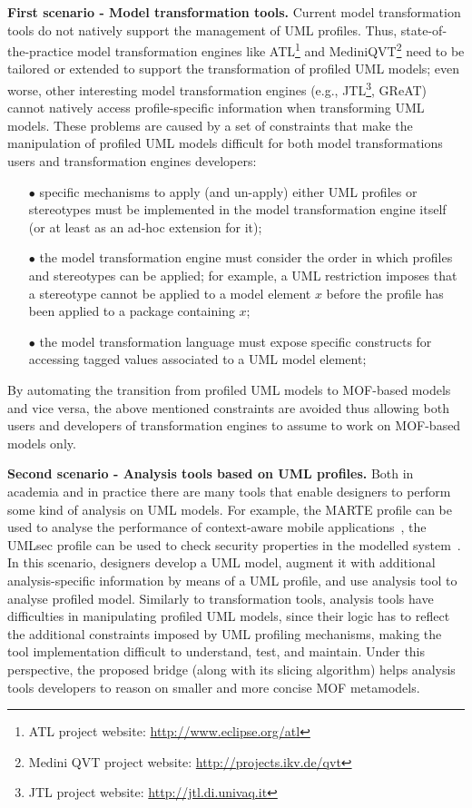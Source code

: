 \textbf{First scenario - Model transformation tools.}
Current model transformation tools do not natively support the management of UML profiles.
Thus, state-of-the-practice model transformation engines
like ATL\footnote{ATL project website: \small{\url{http://www.eclipse.org/atl}}} and
MediniQVT\footnote{Medini QVT project website: \small{\url{http://projects.ikv.de/qvt}}}
need to be tailored or extended to support the transformation of profiled UML models;
even worse, other interesting model transformation engines (e.g.,
JTL\footnote{JTL project website: \small{\url{http://jtl.di.univaq.it}}}, GReAT)
cannot natively access profile-specific information when transforming UML models.
These problems are caused by a set of constraints that make the manipulation of profiled UML models difficult for both model transformations users and transformation engines developers:
%
\vspace{-.15cm}
\begin{itemize}
	\item[$\bullet$] specific mechanisms to apply (and un-apply) either UML profiles or stereotypes must be implemented
	in the model transformation engine itself (or at least as an ad-hoc extension for it);
	\item[$\bullet$] the model transformation engine must consider the order in which profiles and stereotypes can be applied;
	for example, a UML restriction imposes that a stereotype cannot be applied to a model element $x$ before
	the profile has been applied to a package containing $x$;
	\item[$\bullet$] the model transformation language must expose specific constructs for accessing tagged values associated to a UML model element;
\end{itemize}
%
\vspace{-.15cm}
By automating the transition from profiled UML models to MOF-based models and vice versa, the above mentioned constraints
are avoided thus allowing both users and developers of transformation engines to assume to work on MOF-based models only.

\textbf{Second scenario - Analysis tools based on UML profiles.}
Both in academia and in practice there are many tools that enable designers to perform some kind of analysis on UML models.
For example, 
the MARTE profile can be used to analyse the performance of context-aware mobile applications~\cite{perfMarte},
the UMLsec profile 
can be used to check security properties in the modelled system~\cite{securityUMLsec}.
In this scenario, designers develop a UML model, augment it with additional analysis-specific information by means of a UML profile, and  use analysis tool to analyse profiled model.
Similarly to transformation tools, analysis tools have difficulties in manipulating profiled UML models, since
their logic has to reflect the additional constraints imposed by UML profiling mechanisms, making the tool
implementation difficult to understand, test, and maintain.
Under this perspective, the proposed bridge (along with its slicing algorithm)
helps analysis tools developers to reason on smaller and more concise MOF metamodels.

